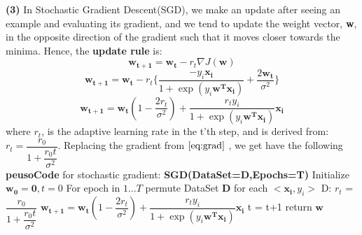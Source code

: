 \documentclass{article}
\renewcommand\part[1]{\vspace{.10in}\textbf{(#1)}}
\begin{document}
	\part{3} In Stochastic Gradient Descent(SGD), we make an update after seeing an example and evaluating its gradient, and we tend to update the weight vector, \textbf{w}, in the opposite direction of the gradient such that it moves closer towards the minima. Hence, the \textbf {update rule} is:
	\[ \mathbf{w_{t+1}} = \mathbf{w_t} - r_t \nabla J(\mathbf{w}) \]
	\[ \mathbf{w_{t+1}} = \mathbf{w_t} - r_t\{ \dfrac{-y_i\mathbf{x_i}}{1 + \exp(y_i\mathbf{w^Tx_i})} + \dfrac{2\mathbf{w_t}}{\sigma^2}\}\]
	\[ \mathbf{w_{t+1}} = \mathbf{w_t}(1 - \dfrac{2r_t}{\sigma^2}) + \dfrac{r_t y_i}{1 + \exp(y_i\mathbf{w^Tx_i})}\mathbf{x_i} \]
	where $r_t$, is the adaptive learning rate in the t'th step, and is derived from: $r_t = \dfrac{r_0}{1 + \dfrac{r_0t}{\sigma^2}}$. Replacing the gradient from $\eqref{eq:grad}$ , we get have the following \textbf {peusoCode} for stochastic gradient: \newline
	\textbf{SGD(DataSet=D,Epochs=T)} \newline
	\hspace*{0.5cm} Initialize $\mathbf{w_0 = 0}, t = 0$ \newline
	\hspace*{0.5cm} For epoch in $1 \dots T$ \newline
	\hspace*{1.0cm}    permute DataSet \textbf{D} \newline
	\hspace*{1.0cm}    for each $<\mathbf{x_i},y_i>$ D: \newline
	\hspace*{1.5cm}    	$r_t$ = $\dfrac{r_0}{1 + \dfrac{r_0t}{\sigma^2}}$ \newline
	\hspace*{1.5cm}		$ \mathbf{w_{t+1}} = \mathbf{w_t}(1 - \dfrac{2r_t}{\sigma^2}) + \dfrac{r_t y_i}{1 + \exp(y_i\mathbf{w^Tx_i})}\mathbf{x_i} $ \newline
	\hspace*{1.5cm}		t = t+1 \newline
	\hspace*{0.5cm} return $\mathbf{w}$
\end{document}

